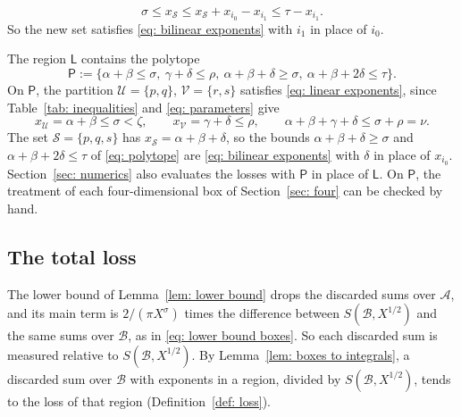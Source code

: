 \documentclass{article}
\numberwithin{equation}{section}
\newcommand{\Le}{\leqslant}
\newcommand{\Ge}{\geqslant}
\begin{document}
\begin{equation*}
\sigma \Le x_{\mathcal{S}} \Le x_{\mathcal{S}} + x_{i_0} - x_{i_1} \Le \tau - x_{i_1}.
\end{equation*}
So the new set satisfies \eqref{eq: bilinear exponents} with $i_1$ in place of $i_0$.

The region $\mathsf{L}$ contains the polytope
\begin{equation}
\label{eq: polytope}
\mathsf{P} := \bigl\{ \alpha + \beta \Le \sigma,\ \gamma + \delta \Le \rho,\ \alpha + \beta + \delta \Ge \sigma,\ \alpha + \beta + 2\delta \Le \tau \bigr\}.
\end{equation}
On $\mathsf{P}$, the partition $\mathcal{U} = \{p, q\}$, $\mathcal{V} = \{r, s\}$ satisfies \eqref{eq: linear exponents}, since Table~\ref{tab: inequalities} and \eqref{eq: parameters} give
\begin{equation*}
x_{\mathcal{U}} = \alpha + \beta \Le \sigma < \zeta, \qquad x_{\mathcal{V}} = \gamma + \delta \Le \rho, \qquad \alpha + \beta + \gamma + \delta \Le \sigma + \rho = \nu.
\end{equation*} The set $\mathcal{S} = \{p, q, s\}$ has $x_{\mathcal{S}} = \alpha + \beta + \delta$, so the bounds $\alpha + \beta + \delta \Ge \sigma$ and $\alpha + \beta + 2\delta \Le \tau$ of \eqref{eq: polytope} are \eqref{eq: bilinear exponents} with $\delta$ in place of $x_{i_0}$. Section~\ref{sec: numerics} also evaluates the losses with $\mathsf{P}$ in place of $\mathsf{L}$. On $\mathsf{P}$, the treatment of each four-dimensional box of Section~\ref{sec: four} can be checked by hand.

\subsection{The total loss}
\label{subsec: total loss}

The lower bound of Lemma~\ref{lem: lower bound} drops the discarded sums over $\mathcal{A}$, and its main term is $2/(\pi X^{\sigma})$ times the difference between $S(\mathcal{B}, X^{1/2})$ and the same sums over $\mathcal{B}$, as in \eqref{eq: lower bound boxes}. So each discarded sum is measured relative to $S(\mathcal{B}, X^{1/2})$. By Lemma~\ref{lem: boxes to integrals}, a discarded sum over $\mathcal{B}$ with exponents in a region, divided by $S(\mathcal{B}, X^{1/2})$, tends to the loss of that region (Definition~\ref{def: loss}).
\end{document}

